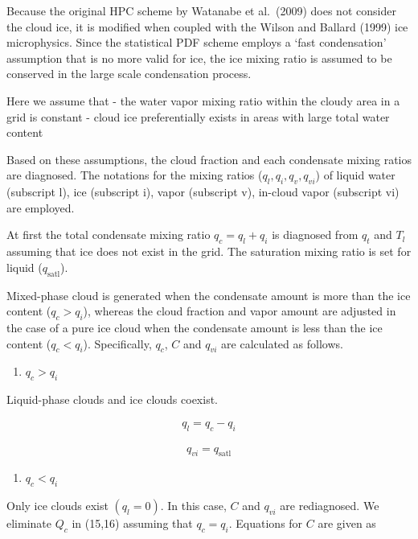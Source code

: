 Because the original HPC scheme by Watanabe et al.~(2009) does not
consider the cloud ice, it is modified when coupled with the Wilson and
Ballard (1999) ice microphysics. Since the statistical PDF scheme
employs a `fast condensation' assumption that is no more valid for ice,
the ice mixing ratio is assumed to be conserved in the large scale
condensation process.

Here we assume that - the water vapor mixing ratio within the cloudy
area in a grid is constant - cloud ice preferentially exists in areas
with large total water content

Based on these assumptions, the cloud fraction and each condensate
mixing ratios are diagnosed. The notations for the mixing ratios
(\(q_l, q_i, q_v, q_{vi}\)) of liquid water (subscript l), ice
(subscript i), vapor (subscript v), in-cloud vapor (subscript vi) are
employed.

At first the total condensate mixing ratio \(q_c =q_l + q_i\) is
diagnosed from \(q_t\) and \(T_l\) assuming that ice does not exist in
the grid. The saturation mixing ratio is set for liquid
(\(q_{\text{satl}}\)).

Mixed-phase cloud is generated when the condensate amount is more than
the ice content (\(q_c>q_i\)), whereas the cloud fraction and vapor
amount are adjusted in the case of a pure ice cloud when the condensate
amount is less than the ice content (\(q_c<q_i\)). Specifically,
\(q_c\), \(C\) and \(q_{vi}\) are calculated as follows.

\begin{enumerate}
\def\labelenumi{\arabic{enumi}.}
\tightlist
\item
  \(q_c>q_i\)
\end{enumerate}

Liquid-phase clouds and ice clouds coexist.

\begin{eqnarray}
q_l= q_c-q_i
\end{eqnarray}

\begin{eqnarray}
q_{vi} = q_{\text{satl}}
\end{eqnarray}

\begin{enumerate}
\def\labelenumi{\arabic{enumi}.}
\setcounter{enumi}{1}
\tightlist
\item
  \(q_c<q_i\)
\end{enumerate}

Only ice clouds exist \((q_l=0)\). In this case, \(C\) and \(q_{vi}\)
are rediagnosed. We eliminate \(Q_c\) in (15,16) assuming that
\(q_c=q_i\). Equations for \(C\) are given as

